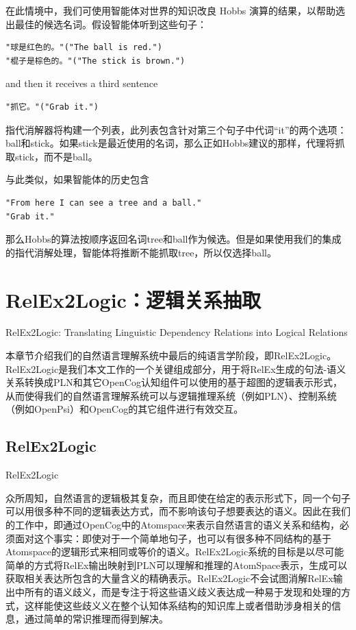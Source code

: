 在此情境中，我们可使用智能体对世界的知识改良 Hobbs 演算的结果，以帮助选出最佳的候选名词。假设智能体听到这些句子：


\begin{verbatim}
"球是红色的。"("The ball is red.")
"棍子是棕色的。"("The stick is brown.") 

\end{verbatim}

\noindent and then it receives a third sentence

\begin{verbatim}
"抓它。"("Grab it.")
\end{verbatim}

指代消解器将构建一个列表，此列表包含针对第三个句子中代词“it”的两个选项：ball和stick。如果stick是最近使用的名词，那么正如Hobbs建议的那样，代理将抓取stick，而不是ball。

与此类似，如果智能体的历史包含

\begin{verbatim}
"From here I can see a tree and a ball."
"Grab it."
\end{verbatim}

那么Hobbs的算法按顺序返回名词tree和ball作为候选。但是如果使用我们的集成的指代消解处理，智能体将推断不能抓取tree，所以仅选择ball。


\section{RelEx2Logic：逻辑关系抽取}{RelEx2Logic: Translating Linguistic Dependency Relations into Logical Relations}

本章节介绍我们的自然语言理解系统中最后的纯语言学阶段，即RelEx2Logic。RelEx2Logic是我们本文工作的一个关键组成部分，用于将RelEx生成的句法-语义关系转换成PLN和其它OpenCog认知组件可以使用的基于超图的逻辑表示形式，从而使得我们的自然语言理解系统可以与逻辑推理系统（例如PLN）、控制系统（例如OpenPsi）和OpenCog的其它组件进行有效交互。

\subsection{RelEx2Logic}{RelEx2Logic}

众所周知，自然语言的逻辑极其复杂，而且即使在给定的表示形式下，同一个句子可以用很多种不同的逻辑表达方式，而不影响该句子想要表达的语义。因此在我们的工作中，即通过OpenCog中的Atomspace来表示自然语言的语义关系和结构，必须面对这个事实：即使对于一个简单地句子，也可以有很多种不同结构的基于Atomspace的逻辑形式来相同或等价的语义。RelEx2Logic系统的目标是以尽可能简单的方式将RelEx输出映射到PLN可以理解和推理的AtomSpace表示，生成可以获取相关表达所包含的大量含义的精确表示。RelEx2Logic不会试图消解RelEx输出中所有的语义歧义，而是专注于将这些语义歧义表达成一种易于发现和处理的方式，这样能使这些歧义义在整个认知体系结构的知识库上或者借助涉身相关的信息，通过简单的常识推理而得到解决。

